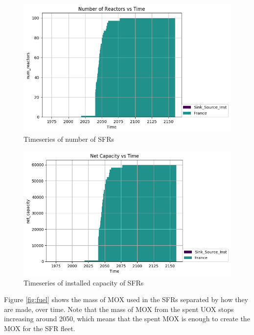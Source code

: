 \begin{figure}[htbp!]
	\begin{center}
		\includegraphics{./images/number_plot.png}
	\end{center}
	\caption{Timeseries of number of \gls{SFR}s}
	\label{fig:sfr_num}
\end{figure}

\begin{figure}[htbp!]
	\begin{center}
		\includegraphics{./images/power_plot.png}
	\end{center}
	\caption{Timeseries of installed capacity of \gls{SFR}s}
	\label{fig:sfr_cap}
\end{figure}

Figure \ref{fig:fuel} shows the mass of \gls{MOX} used in the 
\gls{SFR}s separated by how they are made, over time.
Note that the mass of \gls{MOX} from the spent \gls{UOX}
stops increasing around 2050, which means that the spent
\gls{MOX} is enough to create the \gls{MOX} for the
\gls{SFR} fleet. 

